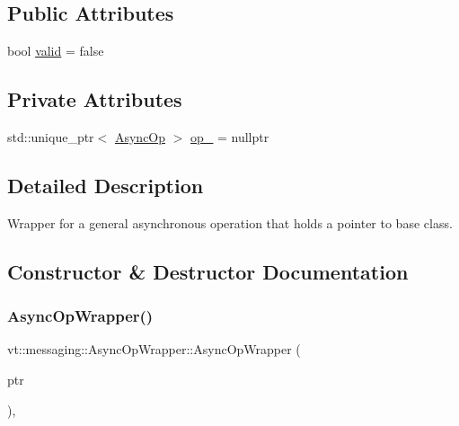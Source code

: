 \subsection*{Public Attributes}
\begin{DoxyCompactItemize}
\item 
bool \hyperlink{structvt_1_1messaging_1_1_async_op_wrapper_a040e00648d1bb44428dac609671ef2ae}{valid} = false
\end{DoxyCompactItemize}
\subsection*{Private Attributes}
\begin{DoxyCompactItemize}
\item 
std\+::unique\+\_\+ptr$<$ \hyperlink{structvt_1_1messaging_1_1_async_op}{Async\+Op} $>$ \hyperlink{structvt_1_1messaging_1_1_async_op_wrapper_a9b297f0a0e7852ec34b51937da04fc10}{op\+\_\+} = nullptr
\end{DoxyCompactItemize}


\subsection{Detailed Description}
Wrapper for a general asynchronous operation that holds a pointer to base class. 



\subsection{Constructor \& Destructor Documentation}
\mbox{\label{structvt_1_1messaging_1_1_async_op_wrapper_a06c7dd199e7b2c252e23c8d81950feed}} 
\subsubsection{\texorpdfstring{Async\+Op\+Wrapper()}{AsyncOpWrapper()}}
{\footnotesize\ttfamily vt\+::messaging\+::\+Async\+Op\+Wrapper\+::\+Async\+Op\+Wrapper (\begin{DoxyParamCaption}\item[{std\+::unique\+\_\+ptr$<$ \hyperlink{structvt_1_1messaging_1_1_async_op}{Async\+Op} $>$}]{ptr }\end{DoxyParamCaption})\hspace{0.3cm}{\ttfamily [inline]}, {\ttfamily [explicit]}}




